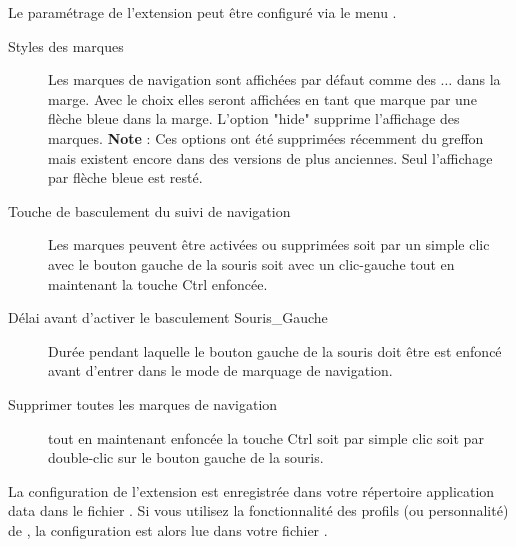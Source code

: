 Le paramétrage de l'extension peut être configuré via le menu .

\begin{description}
\item[Styles des marques] Les marques de navigation sont affichées par défaut comme des $\ldots$ dans la marge. Avec le choix  elles seront affichées en tant que marque par une flèche bleue dans la marge. L'option "hide" supprime l'affichage des marques. \textbf{Note} : Ces options ont été supprimées récemment du greffon mais existent encore dans des versions de \codeblocks plus anciennes. Seul l'affichage par flèche bleue est resté.
\item[Touche de basculement du suivi de navigation] Les marques peuvent être activées ou supprimées soit par un simple clic avec le bouton gauche de la souris soit avec un clic-gauche tout en maintenant la touche Ctrl enfoncée.
\item[Délai avant d'activer le basculement Souris\_Gauche] Durée pendant laquelle le bouton gauche de la souris doit être est enfoncé avant d'entrer dans le mode de marquage de navigation.
\item[Supprimer toutes les marques de navigation] tout en maintenant enfoncée la touche Ctrl soit par simple clic soit par double-clic sur le bouton gauche de la souris.
\end{description}

La configuration de l'extension est enregistrée dans votre répertoire application data dans le fichier . Si vous utilisez la fonctionnalité des profils (ou personnalité) de \codeblocks, la configuration est alors lue dans votre fichier .






